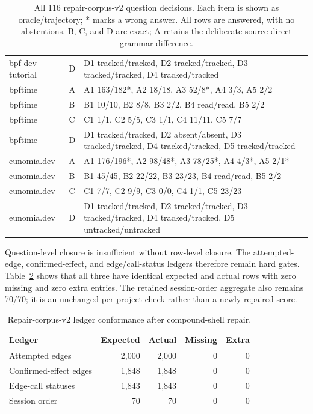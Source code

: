 \documentclass[letterpaper]{article}
\begin{document}
\begin{table}[t]
\begin{tabularx}{\textwidth}{@{}llX@{}}
    bpf-dev-tutorial & D & D1 tracked/tracked, D2 tracked/tracked, D3 tracked/tracked, D4 tracked/tracked \\
    bpftime & A & A1 163/182*, A2 18/18, A3 52/8*, A4 3/3, A5 2/2 \\
    bpftime & B & B1 10/10, B2 8/8, B3 2/2, B4 read/read, B5 2/2 \\
    bpftime & C & C1 1/1, C2 5/5, C3 1/1, C4 11/11, C5 7/7 \\
    bpftime & D & D1 tracked/tracked, D2 absent/absent, D3 tracked/tracked, D4 tracked/tracked, D5 tracked/tracked \\
    eunomia.dev & A & A1 176/196*, A2 98/48*, A3 78/25*, A4 4/3*, A5 2/1* \\
    eunomia.dev & B & B1 45/45, B2 22/22, B3 23/23, B4 read/read, B5 2/2 \\
    eunomia.dev & C & C1 7/7, C2 9/9, C3 0/0, C4 1/1, C5 23/23 \\
    eunomia.dev & D & D1 tracked/tracked, D2 tracked/tracked, D3 tracked/tracked, D4 tracked/tracked, D5 untracked/untracked \\
    \bottomrule
  \end{tabularx}
  \caption{All 116 repair-corpus-v2 question decisions.  Each item is
  shown as oracle/trajectory; * marks a wrong answer.  All rows are answered,
  with no abstentions.  B, C, and D are exact; A retains the deliberate
  source-direct grammar difference.}
  \label{tab:heldout-items}
\end{table}

Question-level closure is insufficient without row-level closure.  The
attempted-edge, confirmed-effect, and edge/call-status ledgers therefore remain
hard gates.  Table~\ref{tab:heldout-ledgers} shows that all three have identical
expected and actual rows with zero missing and zero extra entries.  The
retained session-order aggregate also remains 70/70; it is an unchanged
per-project check rather than a newly repaired score.

\begin{table}[t]
  \centering
  \footnotesize
  \setlength{\tabcolsep}{3pt}
  \begin{tabular}{@{}lrrrr@{}}
    \toprule
    Ledger & Expected & Actual & Missing & Extra \\
    \midrule
    Attempted edges & 2,000 & 2,000 & 0 & 0 \\
    Confirmed-effect edges & 1,848 & 1,848 & 0 & 0 \\
    Edge-call statuses & 1,843 & 1,843 & 0 & 0 \\
    Session order & 70 & 70 & 0 & 0 \\
    \bottomrule
  \end{tabular}
  \caption{Repair-corpus-v2 ledger conformance after compound-shell repair.}
  \label{tab:heldout-ledgers}
\end{table}
\end{document}
